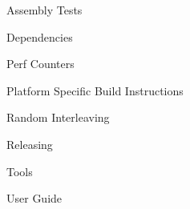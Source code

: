 
\begin{DoxyItemize}
\item Assembly Tests
\item Dependencies
\item Perf Counters
\item Platform Specific Build Instructions
\item Random Interleaving
\item Releasing
\item Tools
\item User Guide 
\end{DoxyItemize}